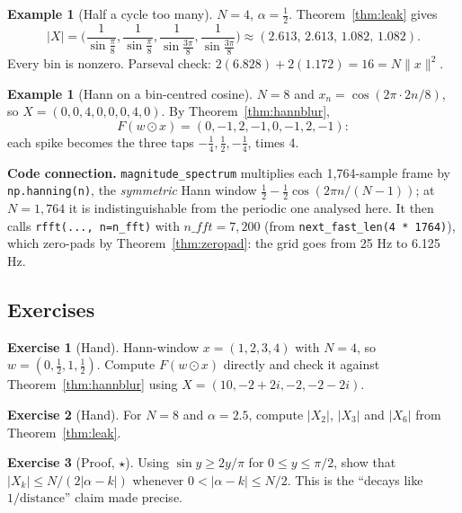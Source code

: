 \documentclass[11pt]{article}
\theoremstyle{definition}
\newtheorem{example}[theorem]{Example}
\newtheorem{innerexercise}{Exercise}[section]
\newenvironment{exercise}[1][]{\begin{innerexercise}[#1]}{\end{innerexercise}}
\newcommand{\norm}[1]{\lVert #1\rVert}
\newcommand{\abs}[1]{\lvert #1\rvert}
\newcommand{\code}[1]{\texttt{#1}}
\begin{document}
\begin{example}[Half a cycle too many]
$N=4$, $\alpha=\frac12$. Theorem~\ref{thm:leak} gives
\[
\abs{X}=\Big(\frac1{\sin\frac\pi8},\frac1{\sin\frac\pi8},\frac1{\sin\frac{3\pi}8},
\frac1{\sin\frac{3\pi}8}\Big)\approx(2.613,\,2.613,\,1.082,\,1.082).
\]
Every bin is nonzero. Parseval check: $2(6.828)+2(1.172)=16=N\norm x^2$.
\end{example}

\begin{example}[Hann on a bin-centred cosine]
$N=8$ and $x_n=\cos(2\pi\cdot2n/8)$, so $X=(0,0,4,0,0,0,4,0)$. By
Theorem~\ref{thm:hannblur},
\[
F(w\odot x)=(0,-1,2,-1,0,-1,2,-1):
\]
each spike becomes the three taps $-\frac14,\frac12,-\frac14$, times 4.
\end{example}

\begin{connection}
\textbf{Code connection.} \code{magnitude\_spectrum} multiplies each 1{,}764-sample
frame by \code{np.hanning(n)}, the \emph{symmetric} Hann window
$\frac12-\frac12\cos(2\pi n/(N-1))$; at $N=1{,}764$ it is indistinguishable from the
periodic one analysed here. It then calls \code{rfft(..., n=n\_fft)} with
$n\_fft=7{,}200$ (from \code{next\_fast\_len(4 * 1764)}), which zero-pads by
Theorem~\ref{thm:zeropad}: the grid goes from 25 Hz to 6.125 Hz.
\end{connection}

\subsection{Exercises}
\begin{exercise}[Hand]\label{ex:hann4}
Hann-window $x=(1,2,3,4)$ with $N=4$, so $w=(0,\frac12,1,\frac12)$. Compute
$F(w\odot x)$ directly and check it against Theorem~\ref{thm:hannblur} using
$X=(10,-2+2i,-2,-2-2i)$.
\end{exercise}

\begin{exercise}[Hand]\label{ex:leak8}
For $N=8$ and $\alpha=2.5$, compute $\abs{X_2}$, $\abs{X_3}$ and $\abs{X_6}$ from
Theorem~\ref{thm:leak}.
\end{exercise}

\begin{exercise}[Proof, $\star$]\label{ex:decay}
Using $\sin y\ge 2y/\pi$ for $0\le y\le\pi/2$, show that
$\abs{X_k}\le N/(2\abs{\alpha-k})$ whenever $0<\abs{\alpha-k}\le N/2$. This is the
``decays like $1/\text{distance}$'' claim made precise.
\end{exercise}
\end{document}
